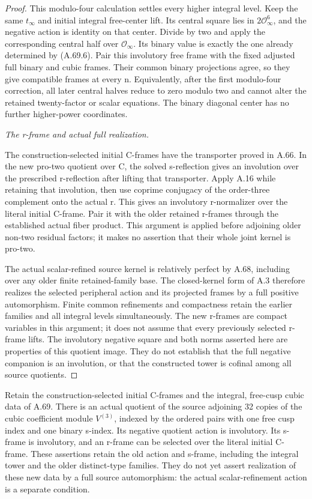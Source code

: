 \begin{proof}
This modulo-four calculation settles every higher integral level.
Keep the same \(t_\infty\) and initial integral free-center lift.
Its central square lies in \(2\mathcal O_\infty^6\), and the
negative action is identity on that center. Divide by two and
apply the corresponding central half over
\(\mathcal O_\infty\). Its binary value is exactly the one
already determined by (A.69.6). Pair this involutory free frame
with the fixed adjusted full binary and cubic frames. Their
common binary projections agree, so they give compatible frames
at every n. Equivalently, after the first modulo-four correction,
all later central halves reduce to zero modulo two and cannot
alter the retained twenty-factor or scalar equations. The binary
diagonal center has no further higher-power coordinates.

\emph{The r-frame and actual full realization.}\par
The construction-selected initial C-frames have the transporter
proved in A.66. In the new pro-two quotient over C, the solved
s-reflection gives an involution over the prescribed r-reflection
after lifting that transporter. Apply A.16 while retaining that
involution, then use coprime conjugacy of the order-three complement
onto the actual r. This gives an involutory r-normalizer over the
literal initial C-frame. Pair it with the older retained r-frames
through the established actual fiber product. This argument is
applied before adjoining older non-two residual factors; it makes
no assertion that their whole joint kernel is pro-two.

The actual scalar-refined source kernel is relatively perfect by
A.68, including over any older finite retained-family base.
The closed-kernel form of A.3 therefore realizes the selected
peripheral action and its projected frames by a full positive
automorphism. Finite common refinements and compactness retain
the earlier families and all integral levels simultaneously.
The new r-frames are compact variables in this argument; it
does not assume that every previously selected r-frame lifts. The involutory negative
square and both norms asserted here are properties of this
quotient image. They do not establish that the full negative
companion is an involution, or that the constructed tower is cofinal among all source
quotients.
\end{proof}




Retain the construction-selected initial C-frames and the integral,
free-cusp cubic data of A.69. There is an actual quotient of the source
adjoining 32 copies of the cubic coefficient module \(V^{(3)}\), indexed
by the ordered pairs with one free cusp index and one binary s-index.
Its negative quotient action is involutory. Its s-frame is involutory,
and an r-frame can be selected over the literal initial C-frame.
These assertions retain the old action and s-frame, including the
integral tower and the older distinct-type families. They do not yet
assert realization of these new data by a full source automorphism:
the actual scalar-refinement action is a separate condition.

